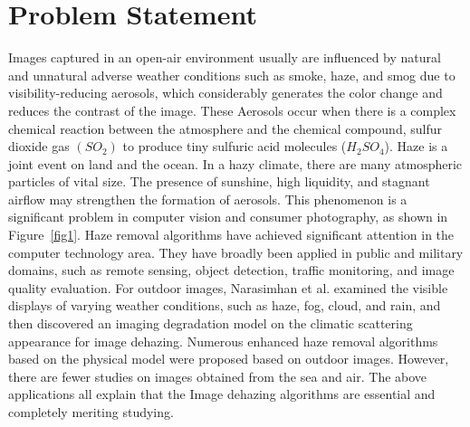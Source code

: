 \documentclass[doctor,english,listoffigures,listoftables]{thesis-uestc}
\begin{document}
\section{Problem Statement}
Images captured in an open-air environment usually are influenced by natural and unnatural adverse weather conditions such as smoke, haze, and smog due to visibility-reducing aerosols, which considerably generates the color change and reduces the contrast of the image. These Aerosols occur when there is a complex chemical reaction between the atmosphere and the chemical compound, sulfur dioxide gas $(SO_2)$ to produce tiny sulfuric acid molecules ($H_2SO_4$). Haze is a joint event on land and the ocean. In a hazy climate, there are many atmospheric particles of vital size. The presence of sunshine, high liquidity, and stagnant airflow may strengthen the formation of aerosols. This phenomenon is a significant problem in computer vision and consumer photography, as shown in Figure~\ref{fig1}. Haze removal algorithms have achieved significant attention in the computer technology area. They have broadly been applied in public and military domains, such as remote sensing, object detection, traffic monitoring, and image quality evaluation. For outdoor images, Narasimhan et al. examined the visible displays of varying weather conditions, such as haze, fog, cloud, and rain, and then discovered an imaging degradation model on the climatic scattering appearance for image dehazing. Numerous enhanced haze removal algorithms based on the physical model were proposed based on outdoor images. However, there are fewer studies on images obtained from the sea and air. The above applications all explain that the Image dehazing algorithms are essential and completely meriting studying.
\end{document}
